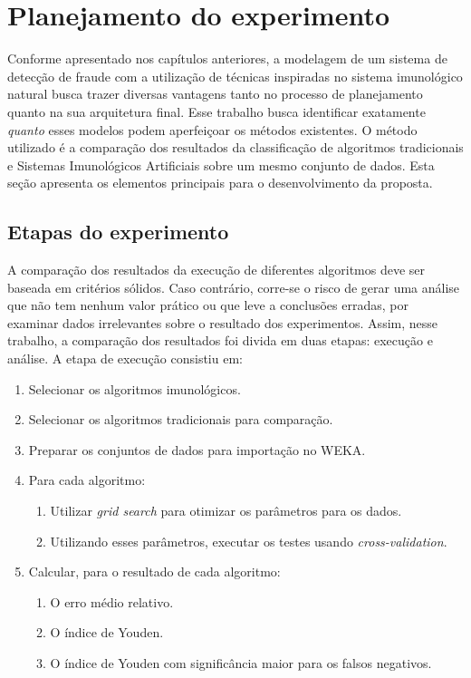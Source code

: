 \chapter{Planejamento do experimento}
\label{chap:prop}

Conforme apresentado nos capítulos anteriores, a modelagem de um sistema de detecção de fraude com a utilização de técnicas inspiradas no sistema imunológico natural busca trazer diversas vantagens tanto no processo de planejamento quanto na sua arquitetura final. Esse trabalho busca identificar exatamente \emph{quanto} esses modelos podem aperfeiçoar os métodos existentes. O método utilizado é a comparação dos resultados da classificação de algoritmos tradicionais e Sistemas Imunológicos Artificiais sobre um mesmo conjunto de dados. Esta seção apresenta os elementos principais para o desenvolvimento da proposta.

\section{Etapas do experimento}

A comparação dos resultados da execução de diferentes algoritmos deve ser baseada em critérios sólidos. Caso contrário, corre-se o risco de gerar uma análise que não tem nenhum valor prático ou que leve a conclusões erradas, por examinar dados irrelevantes sobre o resultado dos experimentos. Assim, nesse trabalho, a comparação dos resultados foi divida em duas etapas: execução e análise. A etapa de execução consistiu em:

\begin{enumerate}
    \item Selecionar os algoritmos imunológicos.
    \item Selecionar os algoritmos tradicionais para comparação.
    \item Preparar os conjuntos de dados para importação no WEKA.
    \item Para cada algoritmo:
        \begin{enumerate}
            \item Utilizar \emph{grid search} para otimizar os parâmetros para os dados.
            \item Utilizando esses parâmetros, executar os testes usando \emph{cross-validation}.
        \end{enumerate}
    \item Calcular, para o resultado de cada algoritmo:
        \begin{enumerate}
            \item O erro médio relativo.
            \item O índice de Youden.
            \item O índice de Youden com significância maior para os falsos negativos.
        \end{enumerate}
\end{enumerate}

